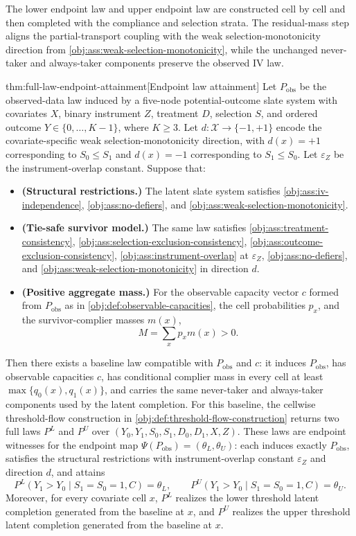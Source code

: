 \documentclass[11pt]{article}
\begin{document}
The lower endpoint law  and upper endpoint law  are constructed cell by cell and then completed with the compliance and selection strata. The residual-mass step aligns the partial-transport coupling with the weak selection-monotonicity direction from \cref{obj:ass:weak-selection-monotonicity}, while the unchanged never-taker and always-taker components preserve the observed IV law.

\begin{theoremv}{thm:full-law-endpoint-attainment}[Endpoint law attainment]
Let \(P_{\mathrm{obs}}\) be the observed-data law induced by a five-node potential-outcome slate system with covariates \(X\), binary instrument \(Z\), treatment \(D\), selection \(S\), and ordered outcome \(Y\in\{0,\ldots,K-1\}\), where \(K\ge 3\). Let \(d:\mathcal X\to\{-1,+1\}\) encode the covariate-specific weak selection-monotonicity direction, with \(d(x)=+1\) corresponding to \(S_0\le S_1\) and \(d(x)=-1\) corresponding to \(S_1\le S_0\). Let \(\varepsilon_Z\) be the instrument-overlap constant. Suppose that:
\begin{itemize}
\item \textbf{(Structural restrictions.)} The latent slate system satisfies \cref{obj:ass:iv-independence}, \cref{obj:ass:no-defiers}, and \cref{obj:ass:weak-selection-monotonicity}.
\item \textbf{(Tie-safe survivor model.)} The same law satisfies \cref{obj:ass:treatment-consistency}, \cref{obj:ass:selection-exclusion-consistency}, \cref{obj:ass:outcome-exclusion-consistency}, \cref{obj:ass:instrument-overlap} at \(\varepsilon_Z\), \cref{obj:ass:no-defiers}, and \cref{obj:ass:weak-selection-monotonicity} in direction \(d\).
\item \textbf{(Positive aggregate mass.)} For the observable capacity vector \(c\) formed from \(P_{\mathrm{obs}}\) as in \cref{obj:def:observable-capacities}, the cell probabilities \(p_x\), and the survivor-complier masses \(m(x)\),
\[
M=\sum_x p_x m(x)>0.
\]
\end{itemize}
Then there exists a baseline law compatible with \(P_{\mathrm{obs}}\) and \(c\): it induces \(P_{\mathrm{obs}}\), has observable capacities \(c\), has conditional complier mass in every cell at least \(\max\{q_0(x),q_1(x)\}\), and carries the same never-taker and always-taker components used by the latent completion. For this baseline, the cellwise threshold-flow construction in \cref{obj:def:threshold-flow-construction} returns two full laws \(P^L\) and \(P^U\) over \((Y_0,Y_1,S_0,S_1,D_0,D_1,X,Z)\). These laws are endpoint witnesses for the endpoint map \(\Psi(P_{\mathrm{obs}})=(\theta_L,\theta_U)\): each induces exactly \(P_{\mathrm{obs}}\), satisfies the structural restrictions with instrument-overlap constant \(\varepsilon_Z\) and direction \(d\), and attains
\[
P^L(Y_1>Y_0\mid S_1=S_0=1,C)=\theta_L,
\qquad
P^U(Y_1>Y_0\mid S_1=S_0=1,C)=\theta_U.
\]
Moreover, for every covariate cell \(x\), \(P^L\) realizes the lower threshold latent completion generated from the baseline at \(x\), and \(P^U\) realizes the upper threshold latent completion generated from the baseline at \(x\).
\end{theoremv}
\end{document}
